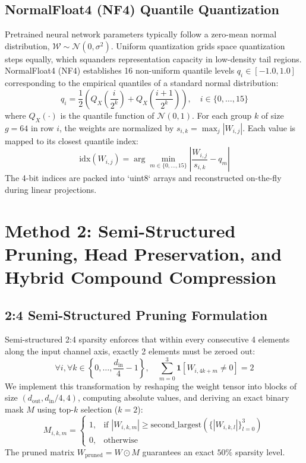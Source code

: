 \documentclass[conference]{IEEEtran}
\begin{document}
\subsection{NormalFloat4 (NF4) Quantile Quantization}
Pretrained neural network parameters typically follow a zero-mean normal distribution, $\mathcal{W} \sim \mathcal{N}(0, \sigma^2)$. Uniform quantization grids space quantization steps equally, which squanders representation capacity in low-density tail regions. NormalFloat4 (NF4) establishes 16 non-uniform quantile levels $q_i \in [-1.0, 1.0]$ corresponding to the empirical quantiles of a standard normal distribution:
\begin{equation}
q_i = \frac{1}{2} \left( Q_X\left(\frac{i}{2^k}\right) + Q_X\left(\frac{i+1}{2^k}\right) \right), \quad i \in \{0, \dots, 15\}
\end{equation}
where $Q_X(\cdot)$ is the quantile function of $\mathcal{N}(0, 1)$. For each group $k$ of size $g=64$ in row $i$, the weights are normalized by $s_{i, k} = \max_j |W_{i, j}|$. Each value is mapped to its closest quantile index:
\begin{equation}
\text{idx}(W_{i, j}) = \arg\min_{m \in \{0, \dots, 15\}} \left| \frac{W_{i, j}}{s_{i, k}} - q_m \right|
\end{equation}
The 4-bit indices are packed into `uint8` arrays and reconstructed on-the-fly during linear projections.

\section{Method 2: Semi-Structured Pruning, Head Preservation, and Hybrid Compound Compression}
\label{sec:method2}

\subsection{2:4 Semi-Structured Pruning Formulation}
Semi-structured 2:4 sparsity enforces that within every consecutive 4 elements along the input channel axis, exactly 2 elements must be zeroed out:
\begin{equation}
\forall i, \forall k \in \left\{0, \dots, \frac{d_{\text{in}}}{4} - 1\right\}, \quad \sum_{m=0}^3 \mathbf{1}[W_{i, 4k + m} \neq 0] = 2
\end{equation}
We implement this transformation by reshaping the weight tensor into blocks of size $(d_{\text{out}}, d_{\text{in}}/4, 4)$, computing absolute values, and deriving an exact binary mask $M$ using top-$k$ selection ($k=2$):
\begin{equation}
M_{i, k, m} = \begin{cases} 
1, & \text{if } |W_{i, k, m}| \ge \text{second\_largest}(\{|W_{i, k, l}|\}_{l=0}^3) \\
0, & \text{otherwise}
\end{cases}
\end{equation}
The pruned matrix $W_{\text{pruned}} = W \odot M$ guarantees an exact $50\%$ sparsity level.
\end{document}
